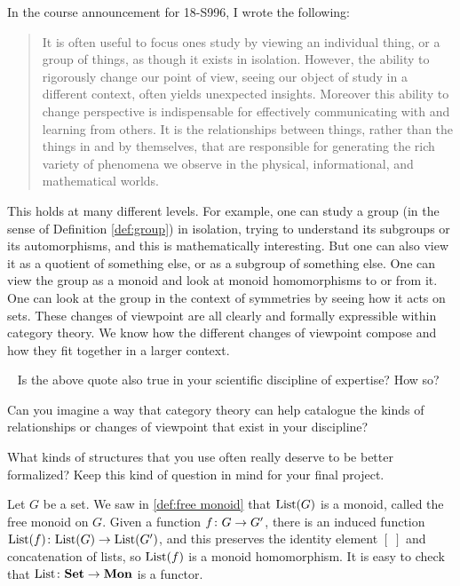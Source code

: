 \documentclass[CT4S-EN-RU]{subfiles}
\begin{document}
\begin{remark}

In the course announcement for 18-S996, I wrote the following:
\begin{quote}
It is often useful to focus ones study by viewing an individual thing, or a group of things, as though it exists in isolation. However, the ability to rigorously change our point of view, seeing our object of study in a different context, often yields unexpected insights. Moreover this ability to change perspective is indispensable for effectively communicating with and learning from others. It is the relationships between things, rather than the things in and by themselves, that are responsible for generating the rich variety of phenomena we observe in the physical, informational, and mathematical worlds.
\end{quote}
This holds at many different levels. For example, one can study a group (in the sense of Definition \ref{def:group}) in isolation, trying to understand its subgroups or its automorphisms, and this is mathematically interesting. But one can also view it as a quotient of something else, or as a subgroup of something else. One can view the group as a monoid and look at monoid homomorphisms to or from it. One can look at the group in the context of symmetries by seeing how it acts on sets. These changes of viewpoint are all clearly and formally expressible within category theory. We know how the different changes of viewpoint compose and how they fit together in a larger context. 

\end{remark}

\begin{exercise}~
\sexc Is the above quote also true in your scientific discipline of expertise? How so? 
\item Can you imagine a way that category theory can help catalogue the kinds of relationships or changes of viewpoint that exist in your discipline? 
\item What kinds of structures that you use often really deserve to be better formalized?
\endsexc
Keep this kind of question in mind for your final project.
\end{exercise}

\begin{example}\label{ex:free monoid}

Let $G$ be a set. We saw in \ref{def:free monoid} that $\textnormal{List}(G)$ is a monoid, called the free monoid on $G$. Given a function $f\colon G\rightarrow G'$, there is an induced function $\textnormal{List}(f)\colon\textnormal{List}(G)\rightarrow\textnormal{List}(G')$, and this preserves the identity element $[\;]$ and concatenation of lists, so $\textnormal{List}(f)$ is a monoid homomorphism. It is easy to check that $\textnormal{List}\colon{\bf Set}\rightarrow{\bf Mon}$ is a functor.

\end{example}
\end{document}
